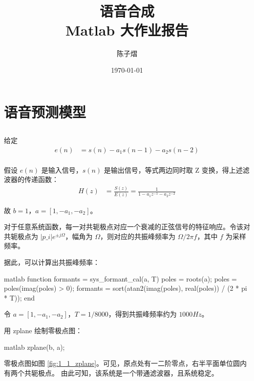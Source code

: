 \documentclass[a4paper]{article}  %
\begin{document}
\title{\textbf{语音合成}\\Matlab 大作业报告}  %
\author{陈子熠}
\date{\today}
\maketitle

\tableofcontents

\newpage

\section{语音预测模型}

\subsection{}\label{sec:1_1}

给定
\begin{align*}
    e(n) &= s(n) - a_1s(n-1) - a_2s(n-2) \\
\end{align*}

假设 $e(n)$ 是输入信号，$s(n)$ 是输出信号，等式两边同时取 Z 变换，得上述滤波器的传递函数：
\begin{align*}
    H(z) &= \frac{S(z)}{E(z)} = \frac{1}{1 - a_1z^{-1} - a_2z^{-2}}
\end{align*}

故 $b = 1$，$a = [1, -a_1, -a_2]$。

对于任意系统函数，每一对共轭极点对应一个衰减的正弦信号的特征响应。令该对共轭极点为 $\lvert{p\_i}\rvert e^{\pm j\Omega}$，幅角为 $\Omega$，则对应的共振峰频率为 $\Omega / 2\pi f$，其中 $f$ 为采样频率。

据此，可以计算出共振峰频率：
\begin{codeblock}{matlab}
function formants = sys_formant_cal(a, T)
    poles = roots(a);
    poles = poles(imag(poles) > 0);
    formants = sort(atan2(imag(poles), real(poles)) / (2 * pi * T));
end
\end{codeblock}

令 $a = [1, -a_1, -a_2]$，$T = 1/8000$，得到共振峰频率约为 $1000 Hz$。

用 zplane 绘制零极点图：
\begin{codeblock}{matlab}
    zplane(b, a);
\end{codeblock}
零极点图如图 \ref{fig:1_1_zplane}。可见，原点处有一二阶零点，右半平面单位圆内有两个共轭极点。
由此可知，该系统是一个带通滤波器，且系统稳定。
\end{document}
